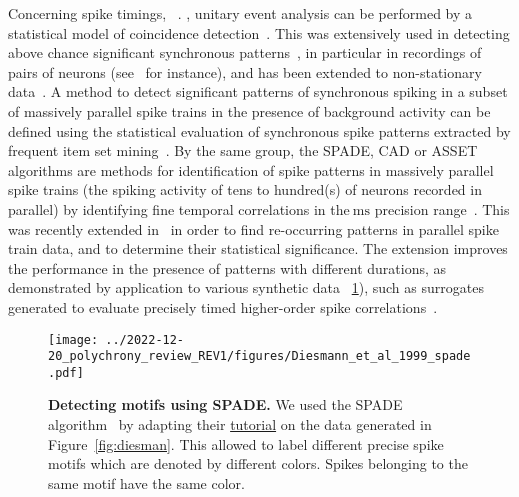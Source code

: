 \documentclass[brainsci, %
               review,submit,pdftex,moreauthors
               ]{Definitions/mdpi}
\newcommand{\ms}{\si{\milli\second}}%
\begin{document}
Concerning spike timings,~\citet{levakova_review_2015}  . , unitary event analysis can be performed by a statistical model of coincidence detection~\citep{grun_unitary_2002-1}. This was extensively used in detecting above chance significant synchronous patterns~\citep{grun_unitary_2010}, in particular in recordings of pairs of neurons (see~\citep{riehle_spike_1997} for instance), and has been extended to non-stationary data~\citep{grun_unitary_2002}. A method to detect significant patterns of synchronous spiking in a subset of massively parallel spike trains in the presence of background activity can be defined using the statistical evaluation of synchronous spike patterns extracted by frequent item set mining~\citep{torre_statistical_2013}. By the same group, the SPADE, CAD or ASSET algorithms are methods for identification of spike patterns in massively parallel spike trains (the spiking activity of tens to hundred(s) of neurons recorded in parallel) by identifying fine temporal correlations in the$~\ms$ precision range~\citep{quaglio_methods_2018}. This was recently extended in~\citep{stella_3d-spade_2019} in order to find re-occurring patterns in parallel spike train data, and to determine their statistical significance. The extension improves the performance in the presence of patterns with different durations, as demonstrated by application to various synthetic data ~\ref{fig:Diesmann_et_al_1999_spade}), such as surrogates generated to evaluate precisely timed higher-order spike correlations~\citep{stella_comparing_2022}.

\begin{figure}[H]
  \centering
  \texttt{[image: ../2022-12-20\_polychrony\_review\_REV1/figures/Diesmann\_et\_al\_1999\_spade.pdf]}
  \caption{\textbf{Detecting motifs using SPADE.} We used the SPADE algorithm~\citep{stella_3d-spade_2019} by adapting their \href{https://elephant.readthedocs.io/en/latest/tutorials/spade.html}{tutorial} on the data generated in  Figure~\ref{fig:diesman}. This allowed to label different precise spike motifs which are denoted by different colors. Spikes belonging to the same motif have the same color. %
  }\label{fig:Diesmann_et_al_1999_spade}
  \end{figure}
  
\end{document}
